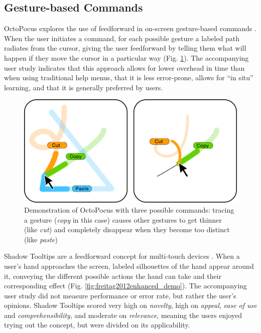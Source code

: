 \documentclass[a4paper,fancychapters]{article}
\begin{document}
	\subsection{Gesture-based Commands} \label{subsec:gesture-based_commands}
	OctoPocus explores the use of feedforward in on-screen gesture-based commands \cite{bau2008octopocus}. When the user initiates a command, for each possible gesture a labeled path radiates from the cursor, giving the user feedforward by telling them what will happen if they move the cursor in a particular way (Fig. \ref{fig:bau2008octopocus_demo}). The accompanying user study indicates that this approach allows for lower overhead in time than when using traditional help menus, that it is less error-prone, allows for ``in situ'' learning, and that it is generally preferred by users.

	\begin{figure}
		\centering
		\includegraphics[width=0.7\linewidth]{img/bau2008octopocus/demo.png}
		\caption{Demonstration of OctoPocus with three possible commands: tracing a gesture (\textit{copy} in this case) causes other gestures to get thinner (like \textit{cut}) and completely disappear when they become too distinct (like \textit{paste}) \cite{bau2008octopocus}}
		\label{fig:bau2008octopocus_demo}
	\end{figure}

	Shadow Tooltips are a feedforward concept for multi-touch devices \cite{freitag2012enhanced}. When a user's hand approaches the screen, labeled silhouettes of the hand appear around it, conveying the different possible actions the hand can take and their corresponding effect (Fig. \ref{fig:freitag2012enhanced_demo}). The accompanying user study did not measure performance or error rate, but rather the user's opinions. Shadow Tooltips scored very high on \textit{novelty}, high on \textit{appeal}, \textit{ease of use} and \textit{comprehensibility}, and moderate on \textit{relevance}, meaning the users enjoyed trying out the concept, but were divided on its applicability.
\end{document}
